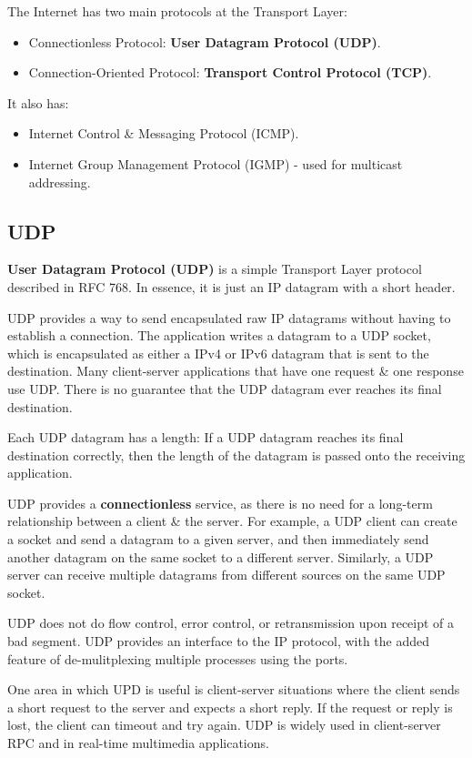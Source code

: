 \documentclass[11pt]{article}
\begin{document}
The Internet has two main protocols at the Transport Layer: 
\begin{itemize}
    \item   Connectionless Protocol: \textbf{User Datagram Protocol (UDP)}.
    \item   Connection-Oriented Protocol: \textbf{Transport Control Protocol (TCP)}.
\end{itemize}

It also has:
\begin{itemize}
    \item   Internet Control \& Messaging Protocol (ICMP).
    \item   Internet Group Management Protocol (IGMP) - used for multicast addressing.   
\end{itemize}

\subsection{UDP}
\textbf{User Datagram Protocol (UDP)} is a simple Transport Layer protocol described in RFC 768. 
In essence, it is just an IP datagram with a short header.

UDP provides a way to send encapsulated raw IP datagrams without having to establish a connection.
The application writes a datagram to a UDP socket, which is encapsulated as either a IPv4 or IPv6 datagram that is sent to the destination. 
Many client-server applications that have one request \& one response use UDP.
There is no guarantee that the UDP datagram ever reaches its final destination.

Each UDP datagram has a length: If a UDP datagram reaches its final destination correctly, then the length of the datagram is passed onto the receiving application.

UDP provides a \textbf{connectionless} service, as there is no need for a long-term relationship between a client \& the server.
For example, a UDP client can create a socket and send a datagram to a given server, and then immediately send another datagram on the same socket to a different server.
Similarly, a UDP server can receive multiple datagrams from different sources on the same UDP socket.

UDP does not do flow control, error control, or retransmission upon receipt of a bad segment.
UDP provides an interface to the IP protocol, with the added feature of de-mulitplexing multiple processes using the ports.

One area in which UPD is useful is client-server situations where the client sends a short request to the server and expects a short reply.
If the request or reply is lost, the client can timeout and try again.
UDP is widely used in client-server RPC and in real-time multimedia applications.
\end{document}
